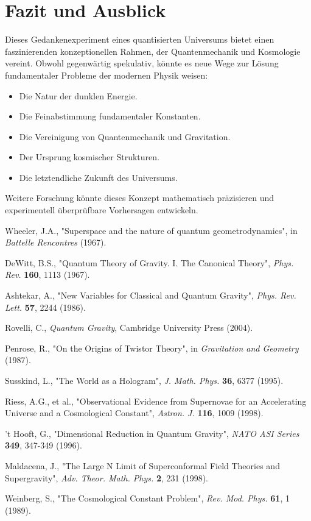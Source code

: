 \documentclass[12pt,a4paper]{article}
\begin{document}
	\section{Fazit und Ausblick}
	
	Dieses Gedankenexperiment eines quantisierten Universums bietet einen faszinierenden konzeptionellen Rahmen, der Quantenmechanik und Kosmologie vereint. Obwohl gegenwärtig spekulativ, könnte es neue Wege zur Lösung fundamentaler Probleme der modernen Physik weisen:
	
	\begin{itemize}
		\item Die Natur der dunklen Energie.
		\item Die Feinabstimmung fundamentaler Konstanten.
		\item Die Vereinigung von Quantenmechanik und Gravitation.
		\item Der Ursprung kosmischer Strukturen.
		\item Die letztendliche Zukunft des Universums.
	\end{itemize}
	
	Weitere Forschung könnte dieses Konzept mathematisch präzisieren und experimentell überprüfbare Vorhersagen entwickeln.
	
	\begin{thebibliography}{99}
		
		 Wheeler, J.A., "Superspace and the nature of quantum geometrodynamics", in \textit{Battelle Rencontres} (1967).
		
		 DeWitt, B.S., "Quantum Theory of Gravity. I. The Canonical Theory", \textit{Phys. Rev.} \textbf{160}, 1113 (1967).
		
		 Ashtekar, A., "New Variables for Classical and Quantum Gravity", \textit{Phys. Rev. Lett.} \textbf{57}, 2244 (1986).
		
		 Rovelli, C., \textit{Quantum Gravity}, Cambridge University Press (2004).
		
		 Penrose, R., "On the Origins of Twistor Theory", in \textit{Gravitation and Geometry} (1987).
		
		 Susskind, L., "The World as a Hologram", \textit{J. Math. Phys.} \textbf{36}, 6377 (1995).
		
		 Riess, A.G., et al., "Observational Evidence from Supernovae for an Accelerating Universe and a Cosmological Constant", \textit{Astron. J.} \textbf{116}, 1009 (1998).
		
		 't Hooft, G., "Dimensional Reduction in Quantum Gravity", \textit{NATO ASI Series} \textbf{349}, 347-349 (1996).
		
		 Maldacena, J., "The Large N Limit of Superconformal Field Theories and Supergravity", \textit{Adv. Theor. Math. Phys.} \textbf{2}, 231 (1998).
		
		 Weinberg, S., "The Cosmological Constant Problem", \textit{Rev. Mod. Phys.} \textbf{61}, 1 (1989).
		
	\end{thebibliography}
	
\end{document}
